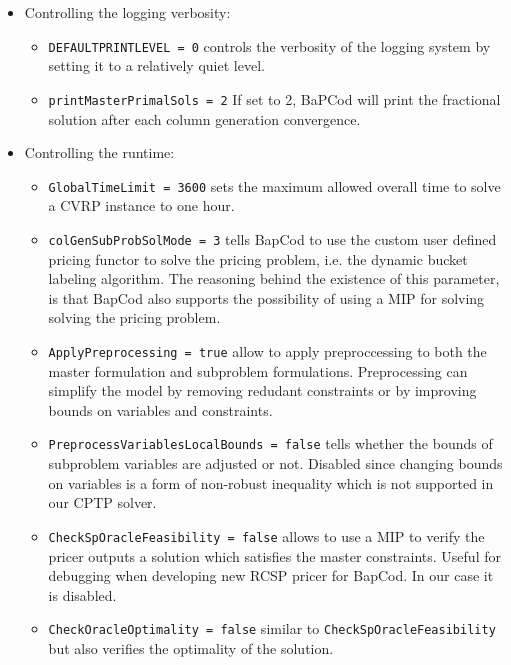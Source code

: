 \begin{itemize}
	\item Controlling the logging verbosity:
	      \begin{itemize}
		      \item \texttt{DEFAULTPRINTLEVEL = 0} controls the verbosity of the logging system by setting it to a relatively quiet level.
		      \item \texttt{printMasterPrimalSols = 2} If set to 2, BaPCod will print the fractional solution after each column generation convergence.
	      \end{itemize}

	\item Controlling the runtime:
	      \begin{itemize}
		      \item \texttt{GlobalTimeLimit = 3600} sets the maximum allowed overall time to solve a CVRP instance to one hour.
		      \item \texttt{colGenSubProbSolMode = 3} tells BapCod to use the custom user defined pricing functor to solve the pricing problem, i.e. the dynamic bucket labeling algorithm.
		            The reasoning behind the existence of this parameter, is that BapCod also supports the possibility of using a MIP for solving solving the pricing problem.
		      \item \texttt{ApplyPreprocessing = true} allow to apply preproccessing to both the master formulation and subproblem formulations.
		            Preprocessing can simplify the model by removing redudant constraints or by improving bounds on variables and constraints.
		      \item \texttt{PreprocessVariablesLocalBounds = false} tells whether the bounds of subproblem variables are adjusted or not. Disabled since changing bounds on variables is a form of non-robust inequality which is not supported in our CPTP solver.

		      \item \texttt{CheckSpOracleFeasibility = false} allows to use a MIP to verify the pricer outputs a solution which satisfies the master constraints. Useful for debugging when developing new RCSP pricer for BapCod.
		            In our case it is disabled.
		      \item \texttt{CheckOracleOptimality = false} similar to \texttt{CheckSpOracleFeasibility} but also verifies the optimality of the solution.
	      \end{itemize}



\end{itemize}
